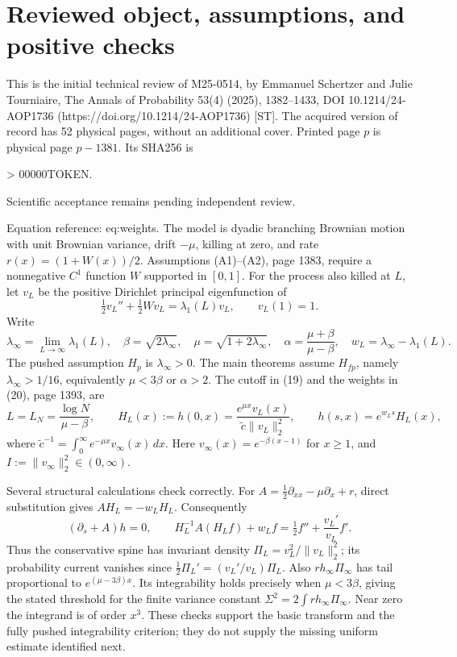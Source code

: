 \documentclass[10pt]{article}
\begin{document}
\section*{Reviewed object, assumptions, and positive checks}
This is the initial technical review of M25-0514, by Emmanuel Schertzer and Julie Tourniaire, The Annals of Probability 53(4) (2025), 1382–1433, DOI 10.1214/24-AOP1736 (https://doi.org/10.1214/24-AOP1736) [ST]. The acquired version of record has 52 physical pages, without an additional cover. Printed page \(p\) is physical page \(p-1381\). Its SHA256 is\par
> 00000TOKEN.\par
Scientific acceptance remains pending independent review.\par
Equation reference: eq:weights. The model is dyadic branching Brownian motion with unit Brownian variance, drift \(-\mu\), killing at zero, and rate \(r(x)=(1+W(x))/2\). Assumptions (A1)–(A2), page 1383, require a nonnegative \(C^1\) function \(W\) supported in \([0,1]\). For the process also killed at \(L\), let \(v_L\) be the positive Dirichlet principal eigenfunction of \[\tfrac12 v_L''+\tfrac12 Wv_L=\lambda_1(L)v_L,\qquad v_L(1)=1.\] Write \[\lambda_\infty=\lim_{L\to\infty}\lambda_1(L),\quad
 \beta=\sqrt{2\lambda_\infty},\quad
 \mu=\sqrt{1+2\lambda_\infty},\quad
 \alpha=\frac{\mu+\beta}{\mu-\beta},\quad
 w_L=\lambda_\infty-\lambda_1(L).\] The pushed assumption \(H_p\) is \(\lambda_\infty>0\). The main theorems assume \(H_{fp}\), namely \(\lambda_\infty>1/16\), equivalently \(\mu<3\beta\) or \(\alpha>2\). The cutoff in (19) and the weights in (20), page 1393, are \[
 L=L_N=\frac{\log N}{\mu-\beta},\qquad
 H_L(x):=h(0,x)=\frac{e^{\mu x}v_L(x)}
                    {\widetilde c\|v_L\|_2^2},\qquad
 h(s,x)=e^{w_Ls}H_L(x),\] where \(\widetilde c^{-1}=\int_0^\infty e^{-\mu x}v_\infty(x)\,dx\). Here \(v_\infty(x)=e^{-\beta(x-1)}\) for \(x\geq1\), and \(I:=\|v_\infty\|_2^2\in(0,\infty)\).\par
Several structural calculations check correctly. For \(A=\frac12\partial_{xx}-\mu\partial_x+r\), direct substitution gives \(AH_L=-w_LH_L\). Consequently \[(\partial_s+A)h=0,\qquad
 H_L^{-1}A(H_L f)+w_Lf
   =\tfrac12f''+\frac{v_L'}{v_L}f'.\] Thus the conservative spine has invariant density \(\Pi_L=v_L^2/\|v_L\|_2^2\); its probability current vanishes since \(\frac12\Pi_L'=(v_L'/v_L)\Pi_L\). Also \(r h_\infty\Pi_\infty\) has tail proportional to \(e^{(\mu-3\beta)x}\). Its integrability holds precisely when \(\mu<3\beta\), giving the stated threshold for the finite variance constant \(\Sigma^2=2\int r h_\infty\Pi_\infty\). Near zero the integrand is of order \(x^3\). These checks support the basic transform and the fully pushed integrability criterion; they do not supply the missing uniform estimate identified next.\par
\end{document}
